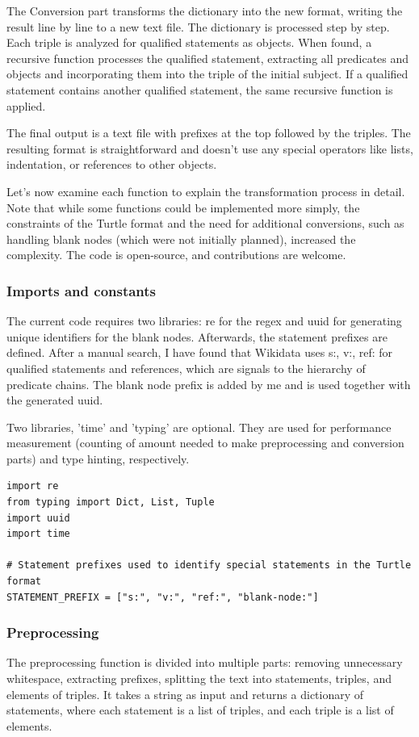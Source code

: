 The Conversion part transforms the dictionary into the new format, writing the result line by line to a new text file. The dictionary is processed step by step. Each triple is analyzed for qualified statements as objects. When found, a recursive function processes the qualified statement, extracting all predicates and objects and incorporating them into the triple of the initial subject. If a qualified statement contains another qualified statement, the same recursive function is applied.

The final output is a text file with prefixes at the top followed by the triples. The resulting format is straightforward and doesn't use any special operators like lists, indentation, or references to other objects.

Let's now examine each function to explain the transformation process in detail. Note that while some functions could be implemented more simply, the constraints of the Turtle format and the need for additional conversions, such as handling blank nodes (which were not initially planned), increased the complexity. The code is open-source, and contributions are welcome.

\subsubsection{Imports and constants}
The current code requires two libraries: re for the regex and uuid for generating unique identifiers for the blank nodes. Afterwards, the statement prefixes are defined. After a manual search, I have found that Wikidata uses s:, v:, ref: for qualified statements and references, which are signals to the hierarchy of predicate chains. The blank node prefix is added by me and is used together with the generated uuid.

Two libraries, 'time' and 'typing' are optional. They are used for performance measurement (counting of amount needed to make preprocessing and conversion parts) and type hinting, respectively.

{\footnotesize
\begin{verbatim}
import re
from typing import Dict, List, Tuple
import uuid
import time

# Statement prefixes used to identify special statements in the Turtle format
STATEMENT_PREFIX = ["s:", "v:", "ref:", "blank-node:"]
\end{verbatim}
}

\subsubsection{Preprocessing}
The preprocessing function is divided into multiple parts: removing unnecessary whitespace, extracting prefixes, splitting the text into statements, triples, and elements of triples. It takes a string as input and returns a dictionary of statements, where each statement is a list of triples, and each triple is a list of elements.

